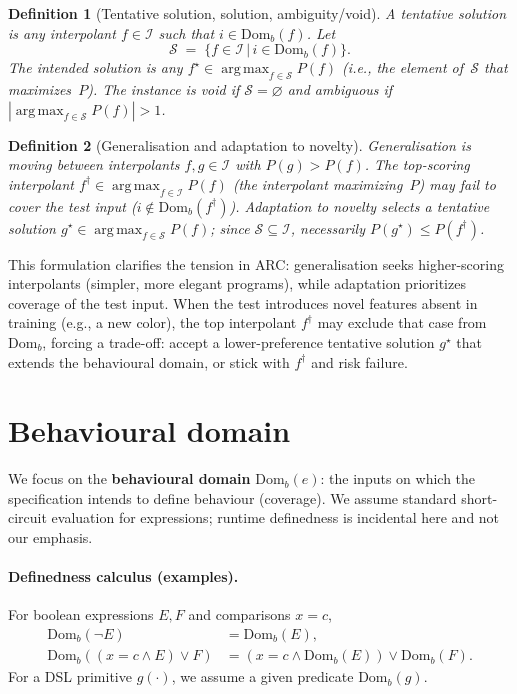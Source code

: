 \documentclass[11pt]{article}
\newtheorem{definition}{Definition}
\newcommand{\Domb}{\mathrm{Dom}_b}
\DeclareMathOperator*{\argmax}{arg\,max}
\begin{document}
\begin{definition}[Tentative solution, solution, ambiguity/void]
A \emph{tentative solution} is any interpolant $f\in\mathcal{I}$ such that $i\in\Domb(f)$. Let
\[
\mathcal{S} \;=\; \bigl\{ f\in\mathcal{I} \,\big|\, i\in\Domb(f)\bigr\}.
\]
The \emph{intended solution} is any $f^\star\in \argmax_{f\in\mathcal{S}} P(f)$ (i.e., the element of~$\mathcal{S}$ that maximizes~$P$). The instance is \emph{void} if $\mathcal{S}=\varnothing$ and \emph{ambiguous} if $|\argmax_{f\in\mathcal{S}} P(f)|>1$.
\end{definition}

\begin{definition}[Generalisation and adaptation to novelty]
\emph{Generalisation} is moving between interpolants $f,g\in\mathcal{I}$ with $P(g)>P(f)$. The top-scoring interpolant $f^\dagger\in\argmax_{f\in\mathcal{I}}P(f)$ (the interpolant maximizing~$P$) may fail to cover the test input ($i\notin\Domb(f^\dagger)$). \emph{Adaptation to novelty} selects a tentative solution $g^\star\in\argmax_{f\in\mathcal{S}}P(f)$; since $\mathcal{S}\subseteq\mathcal{I}$, necessarily $P(g^\star)\le P(f^\dagger)$.
\end{definition}

This formulation clarifies the tension in ARC: generalisation seeks higher-scoring interpolants (simpler, more elegant programs), while adaptation prioritizes coverage of the test input. When the test introduces novel features absent in training (e.g., a new color), the top interpolant $f^\dagger$ may exclude that case from $\Domb$, forcing a trade-off: accept a lower-preference tentative solution $g^\star$ that extends the behavioural domain, or stick with $f^\dagger$ and risk failure.

\section{Behavioural domain}

We focus on the \textbf{behavioural domain} $\Domb(e)$: the inputs on which the specification intends to define behaviour (coverage). We assume standard short-circuit evaluation for expressions; runtime definedness is incidental here and not our emphasis.

\paragraph{Definedness calculus (examples).}
For boolean expressions $E,F$ and comparisons $x{=}c$,
\begin{align}
\Domb(\lnot E) &= \Domb(E), \label{eq:not}\\
\Domb((x{=}c \land E) \lor F) &= (x{=}c \land \Domb(E)) \lor \Domb(F). \label{eq:conjdisj}
\end{align}
For a DSL primitive $g(\cdot)$, we assume a given predicate $\Domb(g)$.
\end{document}
